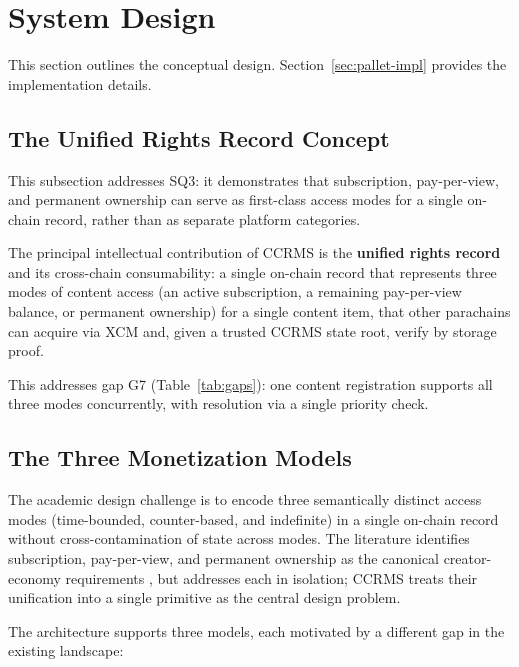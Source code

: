 \section{System Design}\label{sec:system-design}

This section outlines the conceptual design. Section~\ref{sec:pallet-impl} provides the implementation details.

\subsection{The Unified Rights Record Concept}\label{subsec:unified-rights-token}

This subsection addresses SQ3: it demonstrates that subscription, pay-per-view, and permanent ownership can serve as first-class access modes for a single on-chain record, rather than as separate platform categories.

The principal intellectual contribution of CCRMS is the \textbf{unified rights record} and its cross-chain consumability: a single on-chain record that represents three modes of content access (an active subscription, a remaining pay-per-view balance, or permanent ownership) for a single content item, that other parachains can acquire via XCM and, given a trusted CCRMS state root, verify by storage proof.

This addresses gap G7 (Table~\ref{tab:gaps}): one content registration supports all three modes concurrently, with resolution via a single priority check.

\subsection{The Three Monetization Models}\label{subsec:three-models}

The academic design challenge is to encode three semantically distinct access modes (time-bounded, counter-based, and indefinite) in a single on-chain record without cross-contamination of state across modes. The literature identifies subscription, pay-per-view, and permanent ownership as the canonical creator-economy requirements \citep{cirelloEtAl2023, mendozaTelloEtAl2024}, but addresses each in isolation; CCRMS treats their unification into a single primitive as the central design problem.

The architecture supports three models, each motivated by a different gap in the existing landscape:

